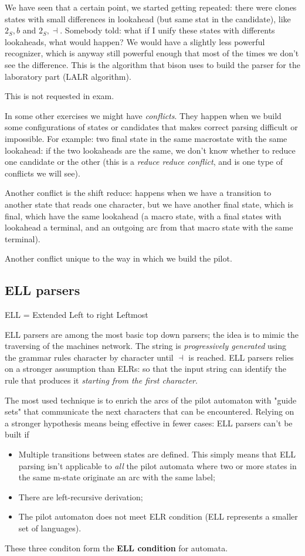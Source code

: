 			We have seen that a certain point, we started getting repeated: there were clones states with small differences in lookahead (but same stat in the 
			candidate), like $2_S,b$ and $2_S,\dashv$. Somebody told: what if I unify these states with differents lookaheads, what would happen? We would have a slightly less
			powerful recognizer, which is anyway still powerful enough that most of the times we don't see the difference. This is the algorithm that bison uses to 
			build the parser for the laboratory part (LALR algorithm).

			This is not requested in exam.

			In some other exercises we might have \emph{conflicts}. They happen when we build some configurations of states or candidates that makes 
			correct parsing difficult or impossible. For example: two final state in the same macrostate with the same lookahead: if the two lookaheads are the 
			same, we don't know whether to reduce one candidate or the other (this is a \emph{reduce reduce conflict}, and is one type of conflicts we will see).

			Another conflict is the shift reduce: happens when we have a transition to another state that reads one character, but we have another final state, which is final, which have the same 
			lookahead (a macro state, with a final states with lookahead a terminal, and an outgoing arc from that macro state with the same terminal).

			Another conflict unique to the way in which we build the pilot. %
		\subsection{ELL parsers}
			ELL = Extended Left to right Leftmost

			ELL parsers are among the most basic top down parsers; the idea is to mimic the traversing of the machines network. The string is 
			\emph{progressively generated} using the grammar rules character by character until $\dashv$ is reached. ELL parsers relies on a stronger assumption 
			than ELRs: so that the input string can identify the rule that produces it \emph{starting from the first character}.

			The most used technique is to enrich the arcs of the pilot automaton with "guide sets" that communicate the next characters that can be encountered. 
			Relying on a stronger hypothesis means being effective in fewer cases: ELL parsers can't be built if
			\begin{itemize}
				\item Multiple transitions between states are defined. This simply means that ELL parsing isn't applicable to \emph{all} the pilot automata where 
				two or more states in the same m-state originate an arc with the same label;
				\item There are left-recursive derivation;
				\item The pilot automaton does not meet ELR condition (ELL represents a smaller set of languages). 
			\end{itemize}
			These three conditon form the \textbf{ELL condition} for automata.
			
